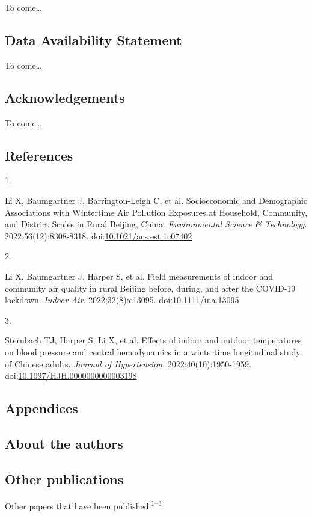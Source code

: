 \documentclass[
  letterpaper,
  DIV=11,
  numbers=noendperiod]{scrartcl}
\newlength{\cslhangindent}
\newlength{\csllabelwidth}
\newlength{\cslentryspacingunit} %
\newenvironment{CSLReferences}[2] %
 {%
  \setlength{\parindent}{0pt}
  \ifodd #1
  \let\oldpar\par
  \def\par{\hangindent=\cslhangindent\oldpar}
  \fi
  \setlength{\parskip}{#2\cslentryspacingunit}
 }%
 {}
\newcommand{\CSLLeftMargin}[1]{\parbox[t]{\csllabelwidth}{#1}}
\newcommand{\CSLRightInline}[1]{\parbox[t]{\linewidth - \csllabelwidth}{#1}\break}
\begin{document}
To come\ldots{}

\hypertarget{data-availability-statement}{%
\subsection{Data Availability
Statement}\label{data-availability-statement}}

To come\ldots{}

\hypertarget{acknowledgements}{%
\subsection{Acknowledgements}\label{acknowledgements}}

To come\ldots{}

\hypertarget{references}{%
\subsection{References}\label{references}}

\hypertarget{refs}{}
\begin{CSLReferences}{0}{0}
\leavevmode{}%
\CSLLeftMargin{1. }%
\CSLRightInline{Li X, Baumgartner J, Barrington-Leigh C, et al.
Socioeconomic and {Demographic Associations} with {Wintertime Air
Pollution Exposures} at {Household}, {Community}, and {District Scales}
in {Rural Beijing}, {China}. \emph{Environmental Science \& Technology}.
2022;56(12):8308-8318.
doi:\href{https://doi.org/10.1021/acs.est.1c07402}{10.1021/acs.est.1c07402}}

\leavevmode{}%
\CSLLeftMargin{2. }%
\CSLRightInline{Li X, Baumgartner J, Harper S, et al. Field measurements
of indoor and community air quality in rural {Beijing} before, during,
and after the {COVID-19} lockdown. \emph{Indoor Air}. 2022;32(8):e13095.
doi:\href{https://doi.org/10.1111/ina.13095}{10.1111/ina.13095}}

\leavevmode{}%
\CSLLeftMargin{3. }%
\CSLRightInline{Sternbach TJ, Harper S, Li X, et al. Effects of indoor
and outdoor temperatures on blood pressure and central hemodynamics in a
wintertime longitudinal study of {Chinese} adults. \emph{Journal of
Hypertension}. 2022;40(10):1950-1959.
doi:\href{https://doi.org/10.1097/HJH.0000000000003198}{10.1097/HJH.0000000000003198}}

\end{CSLReferences}

\hypertarget{appendices}{%
\subsection{Appendices}\label{appendices}}

\hypertarget{about-the-authors}{%
\subsection{About the authors}\label{about-the-authors}}

\hypertarget{other-publications}{%
\subsection{Other publications}\label{other-publications}}

Other papers that have been published.\textsuperscript{1--3}
\end{document}
